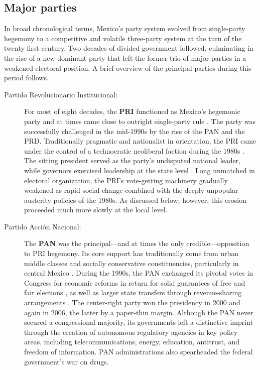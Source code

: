 \documentclass[letter,12pt]{article}
\begin{document}
\subsection{Major parties}

In broad chronological terms, Mexico's party system evolved from single-party hegemony to a competitive and volatile three-party system at the turn of the twenty-first century. Two decades of divided government followed, culminating in the rise of a new dominant party that left the former trio of major parties in a weakened electoral position. A brief overview of the principal parties during this period follows.

\begin{description}

\item[Partido Revolucionario Institucional:] For most of eight decades, the \textbf{PRI} functioned as Mexico's hegemonic party and at times came close to outright single-party rule \citep{molinar.1991a}. The party was successfully challenged in the mid-1990s by the rise of the PAN and the PRD. Traditionally pragmatic and nationalist in orientation, the PRI came under the control of a technocratic neoliberal faction during the 1980s \citep{dresser.Neolib1991}. The sitting president served as the party's undisputed national leader, while governors exercised leadership at the state level \citep{langston.2010}. Long unmatched in electoral organization, the PRI's vote-getting machinery gradually weakened as rapid social change combined with the deeply unpopular austerity policies of the 1980s. As discussed below, however, this erosion proceeded much more slowly at the local level.

\item[Partido Acción Nacional:] The \textbf{PAN} was the principal---and at times the only credible---opposition to PRI hegemony. Its core support has traditionally come from urban middle classes and socially conservative constituencies, particularly in central Mexico \citep{loaeza.pan.2010book}. During the 1990s, the PAN exchanged its pivotal votes in Congress for economic reforms in return for solid guarantees of free and fair elections \citep{cornelius.1996}, as well as larger state transfers through revenue-sharing arrangements \citep{diaz.cayeros.2006, shirk.PANbook.2005}. The center-right party won the presidency in 2000 and again in 2006, the latter by a paper-thin margin. Although the PAN never secured a congressional majority, its governments left a distinctive imprint through the creation of autonomous regulatory agencies in key policy areas, including telecommunications, energy, education, antitrust, and freedom of information. PAN administrations also spearheaded the federal government's war on drugs.


\end{description}
\end{document}
